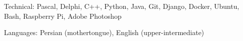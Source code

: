 

\begin{cvskills}

  \cvskill
    {Technical:}
    {Pascal, Delphi, C++, Python, Java, Git, Django, Docker, Ubuntu, Bash, Raspberry Pi, Adobe Photoshop}




  \cvskill
    {Languages:}
    {Persian (mothertongue), English (upper-intermediate)} %

\end{cvskills}
